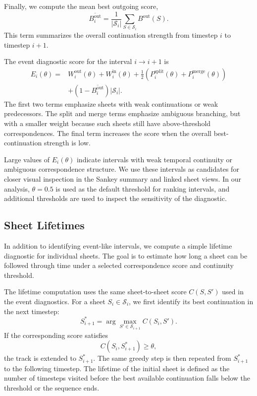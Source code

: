 \documentclass{vgtc}                          %
\newcommand{\Sheets}{\mathcal{S}}
\newcommand{\Sheet}{S}
\newcommand{\Score}{C}
\begin{document}
Finally, we compute the mean best outgoing score,
\[
\overline{B^\mathrm{out}_i} =
\frac{1}{|\Sheets_i|}
\sum_{\Sheet\in\Sheets_i} B^\mathrm{out}(\Sheet).
\]
This term summarizes the overall continuation strength from timestep $i$ to timestep $i+1$.

The event diagnostic score for the interval $i\rightarrow i+1$ is
\[
\begin{aligned}
E_i(\theta)={}&
W^\mathrm{out}_i(\theta)
+
W^\mathrm{in}_i(\theta)
+
\frac{1}{2}
\left(
P^\mathrm{split}_i(\theta)
+
P^\mathrm{merge}_i(\theta)
\right) \\
&+
\left(1-\overline{B^\mathrm{out}_i}\right)
|\Sheets_i|.
\end{aligned}
\]
The first two terms emphasize sheets with weak continuations or weak predecessors. The split and merge terms emphasize ambiguous branching, but with a smaller weight because such sheets still have above-threshold correspondences. The final term increases the score when the overall best-continuation strength is low.

Large values of $E_i(\theta)$ indicate intervals with weak temporal continuity or ambiguous correspondence structure. We use these intervals as candidates for closer visual inspection in the Sankey summary and linked sheet views. In our analysis, $\theta=0.5$ is used as the default threshold for ranking intervals, and additional thresholds are used to inspect the sensitivity of the diagnostic.



\subsection{Sheet Lifetimes}

In addition to identifying event-like intervals, we compute a simple lifetime diagnostic for individual sheets. The goal is to estimate how long a sheet can be followed through time under a selected correspondence score and continuity threshold.

The lifetime computation uses the same sheet-to-sheet score $\Score(\Sheet,\Sheet')$ used in the event diagnostics. For a sheet $\Sheet_i \in \Sheets_i$, we first identify its best continuation in the next timestep:
\[
\Sheet_{i+1}^* =
\arg\max_{\Sheet'\in\Sheets_{i+1}}
\Score(\Sheet_i,\Sheet').
\]
If the corresponding score satisfies
\[
\Score(\Sheet_i,\Sheet_{i+1}^*) \geq \theta,
\]
the track is extended to $\Sheet_{i+1}^*$. The same greedy step is then repeated from $\Sheet_{i+1}^*$ to the following timestep. The lifetime of the initial sheet is defined as the number of timesteps visited before the best available continuation falls below the threshold or the sequence ends.
\end{document}
